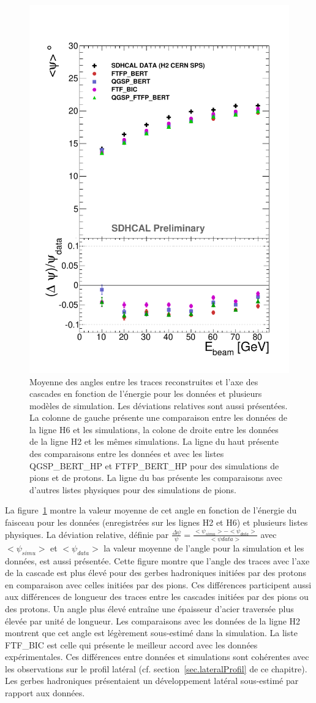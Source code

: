 \begin{figure}[!ht]
  \includegraphics[width=.44\textwidth]{Shower/figs/TRACKANGLE_PION_MODEL_NOV.pdf}
  \caption{Moyenne des angles entre les traces reconstruites et l'axe des cascades en fonction de l'énergie pour les données et plusieurs modèles de simulation. Les déviations relatives sont aussi présentées. La colonne de gauche présente une comparaison entre les données de la ligne H6 et les simulations, la colone de droite entre les données de la ligne H2 et les mêmes simulations. La ligne du haut présente des comparaisons entre les données et avec les listes QGSP\_BERT\_HP et FTFP\_BERT\_HP pour des simulations de pions et de protons. La ligne du bas présente les comparaisons avec d'autres listes physiques pour des simulations de pions.}
  \label{fig.trackangle_pi-_ebeam}
\end{figure}
La figure~\ref{fig.trackangle_pi-_ebeam} montre la valeur moyenne de cet angle en fonction de l'énergie du faisceau pour les données (enregistrées sur les lignes H2 et H6) et plusieurs listes physiques. La déviation relative, définie par $\frac{\Delta \psi}{\psi}=\frac{<\psi_{simu}>-<\psi_{data}>}{<\psi{data}>}$ avec $<\psi_{simu}>$ et $<\psi_{data}>$ la valeur moyenne de l'angle pour la simulation et les données, est aussi présentée. Cette figure montre que l'angle des traces avec l'axe de la cascade est plus élevé pour des gerbes hadroniques initiées par des protons en comparaison avec celles initiées par des pions. Ces différences participent aussi aux différences de longueur des traces entre les cascades initiées par des pions ou des protons. Un angle plus élevé entraîne une épaisseur d'acier traversée plus élevée par unité de longueur. Les comparaisons avec les données de la ligne H2 montrent que cet angle est légèrement sous-estimé dans la simulation. La liste FTF\_BIC est celle qui présente le meilleur accord avec les données expérimentales. Ces différences entre données et simulations sont cohérentes avec les observations sur le profil latéral (cf. section~\ref{sec.lateralProfil} de ce chapitre). Les gerbes hadroniques présentaient un développement latéral sous-estimé par rapport aux données. 

